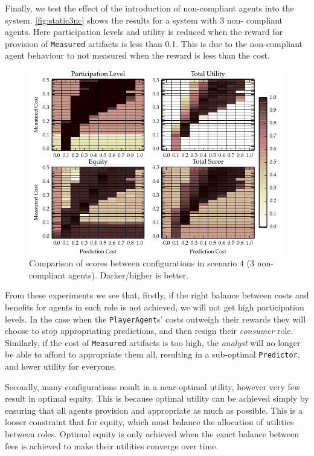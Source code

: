 Finally, we test the effect of the introduction of non-compliant agents into
the system. \autoref{fig:static3nc} shows the results for a system with 3 non-
compliant agents. Here participation levels and utility is reduced when the
reward for provision of \texttt{Measured} artifacts is less than 0.1. This is
due to the non-compliant agent behaviour to not measured when the reward is
less than the cost.

\begin{figure}
\includegraphics{gfx/kc/static_1_3nc.pdf} 
\caption[Comparison of scores between configurations in scenario 4 (3 non-compliant agents).]{Comparison of scores between configurations in scenario 4 (3 non-compliant agents). Darker/higher is better.}\label{fig:static3nc}
\end{figure}

From these experiments we see that, firstly, if the right balance between
costs and benefits for agents in each role is not achieved, we will not get
high participation levels. In the case when the \texttt{PlayerAgent}s' costs
outweigh their rewards they will choose to stop appropriating predictions, and
then resign their \emph{consumer} role. Similarly, if the cost of
\texttt{Measured} artifacts is too high, the \emph{analyst} will no longer be
able to afford to appropriate them all, resulting in a sub-optimal
\texttt{Predictor}, and lower utility for everyone.

Secondly, many configurations result in a near-optimal utility, however very
few result in optimal equity. This is because optimal utility can be achieved
simply by ensuring that all agents provision and appropriate as much as
possible. This is a looser constraint that for equity, which must balance the
allocation of utilities between roles. Optimal equity is only achieved when
the exact balance between fees is achieved to make their utilities converge
over time.

